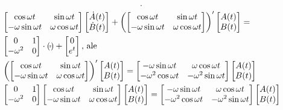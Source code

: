 \documentclass[../main.tex]{subfiles}
\begin{document}
\begin{przyklad}
\[            .\]
            \begin{align*}
                &\begin{bmatrix} \cos\omega t&\sin\omega t\\ -\omega \sin\omega t& \omega \cos\omega t \end{bmatrix} \begin{bmatrix} \dot{A}(t)\\ \dot{B}(t) \end{bmatrix} + \left( \begin{bmatrix} \cos\omega t & \sin\omega t\\ -\omega \sin\omega t & \omega \cos \omega t \end{bmatrix}  \right)'\begin{bmatrix} A(t)\\B(t) \end{bmatrix} = \\
                &\begin{bmatrix} 0&1\\-\omega^2&0 \end{bmatrix} \cdot (_{\tilde \tilde }) + \begin{bmatrix} 0\\e^t \end{bmatrix} \text{, ale }\\
                &\left( \begin{bmatrix} \cos\omega t&\sin\omega t\\ -\omega \sin\omega t & \omega \cos \omega t \end{bmatrix}  \right)' \begin{bmatrix} A(t)\\B(t) \end{bmatrix} = \begin{bmatrix} -\omega \sin\omega t & \omega \cos\omega t\\ -\omega^2\cos\omega t&-\omega^2\sin\omega t \end{bmatrix} \begin{bmatrix} A(t)\\B(t) \end{bmatrix}\\
                &\begin{bmatrix} 0&1\\-\omega^2&0 \end{bmatrix} \begin{bmatrix} \cos\omega t&\sin\omega t\\ -\omega \sin\omega t & \omega \cos\omega t \end{bmatrix} \begin{bmatrix} A(t)\\B(t) \end{bmatrix} = \begin{bmatrix} -\omega \sin\omega t & \omega \cos\omega t \\ -\omega^2\cos\omega t & -\omega^2 \sin\omega t \end{bmatrix}\begin{bmatrix} A(t)\\B(t) \end{bmatrix}\\

\end{align*}
\end{przyklad}
\end{document}
